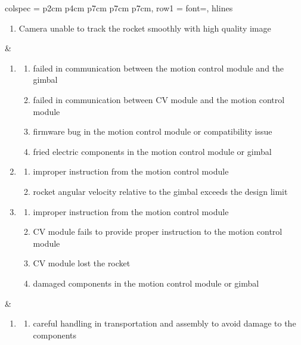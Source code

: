 \documentclass{article}
\begin{document}
\begin{table}[htbp]
{\begin{tblr}{
        colspec = {p{2cm} p{4cm} p{7cm} p{7cm} p{7cm}},
        row{1} = {font=\bfseries},
        hlines
      }
\begin{enumerate}
\begin{enumerate}
                \item Camera unable to track the rocket smoothly with high quality image
              \end{enumerate}
      \end{enumerate}
                                              &
      \begin{enumerate}
        \item \begin{enumerate}
                \item failed in communication between the motion control module and the gimbal
                \item failed in communication between CV module and the motion control module
                \item firmware bug in the motion control module or compatibility issue
                \item fried electric components in the motion control module or gimbal
              \end{enumerate}
        \item \begin{enumerate}
                \item improper instruction from the motion control module
                \item rocket angular velocity relative to the gimbal exceeds the design limit
              \end{enumerate}
        \item \begin{enumerate}
                \item improper instruction from the motion control module
                \item CV module fails to provide proper instruction to the motion control module
                \item CV module lost the rocket
                \item damaged components in the motion control module or gimbal
              \end{enumerate}
      \end{enumerate}
                                              &
      \begin{enumerate}
        \item \begin{enumerate}
                \item careful handling in transportation and assembly to avoid damage to the
                      components

\end{enumerate}
\end{enumerate}
\end{tblr}}
\end{table}
\end{document}
